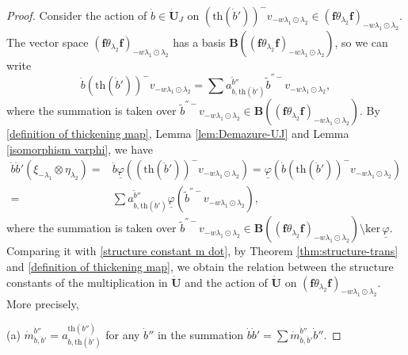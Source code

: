 \documentclass[10pt,a4paper]{amsart}
\begin{document}
\begin{proof}
Consider the action of $\dot{b}\in \dot{\mathbf{U}}_J$ on $(\mathrm{th}(\dot{b}'))^-v_{-w\lambda_1\odot\lambda_2}\in (\mathbf{f}\theta_{\lambda_2}\mathbf{f})_{-w\lambda_1\odot\lambda_2}$. The vector space $(\mathbf{f}\theta_{\lambda_2}\mathbf{f})_{-w\lambda_1\odot\lambda_2}$ has a basis $\mathbf{B}((\mathbf{f}\theta_{\lambda_2}\mathbf{f})_{-w\lambda_1\odot\lambda_2})$, so we can write
\begin{equation}\label{structure constant a}
\dot{b}(\mathrm{th}(\dot{b}'))^-v_{-w\lambda_1\odot\lambda_2}=\sum a_{\dot{b},\mathrm{th}(\dot{b}')}^{\tilde{b}''}\tilde{b}^{''-}v_{-w\lambda_1\odot\lambda_2},  
\end{equation}
where the summation is taken over $\tilde{b}^{''-}v_{-w\lambda_1\odot\lambda_2}\in \mathbf{B}((\mathbf{f}\theta_{\lambda_2}\mathbf{f})_{-w\lambda_1\odot\lambda_2})$. By \eqref{definition of thickening map}, Lemma \ref{lem:Demazure-UJ} and Lemma \ref{isomorphism varphi}, we have 
\begin{align*}
\dot{b}\dot{b}'(\xi_{-\lambda_1}\otimes \eta_{\lambda_2})=&\dot{b}\underline{\varphi}((\mathrm{th}(\dot{b}'))^-v_{-w\lambda_1\odot\lambda_2})=\underline{\varphi}(\dot{b}(\mathrm{th}(\dot{b}'))^-v_{-w\lambda_1\odot\lambda_2})\\
=&\sum a_{\dot{b},\mathrm{th}(\dot{b}')}^{\tilde{b}''}\underline{\varphi}(\tilde{b}^{''-}v_{-w\lambda_1\odot\lambda_2}),   
\end{align*}
where the summation is taken over $\tilde{b}^{''-}v_{-w\lambda_1\odot\lambda_2}\in \mathbf{B}((\mathbf{f}\theta_{\lambda_2}\mathbf{f})_{-w\lambda_1\odot\lambda_2}) \setminus \mathrm{ker}\,\underline{\varphi}$. Comparing it with \eqref{structure constant m dot}, by Theorem \ref{thm:structure-trans} and \eqref{definition of thickening map}, we obtain the relation between the structure constants of the multiplication in $\dot{\mathbf{U}}$ and the action of $\dot{\mathbf{U}}$ on $(\mathbf{f}\theta_{\lambda_2}\mathbf{f})_{-w\lambda_1\odot\lambda_2}$. More precisely,

(a) $\dot{m}_{\dot{b},\dot{b}'}^{\dot{b}''}=a_{\dot{b},\mathrm{th}(\dot{b}')}^{\mathrm{th}(\dot{b}'')}$ for any $\dot{b}''$ in the summation $\dot{b}\dot{b}'=\sum \dot{m}_{\dot{b},\dot{b}'}^{\dot{b}''}\dot{b}''$.


\end{proof}
\end{document}

